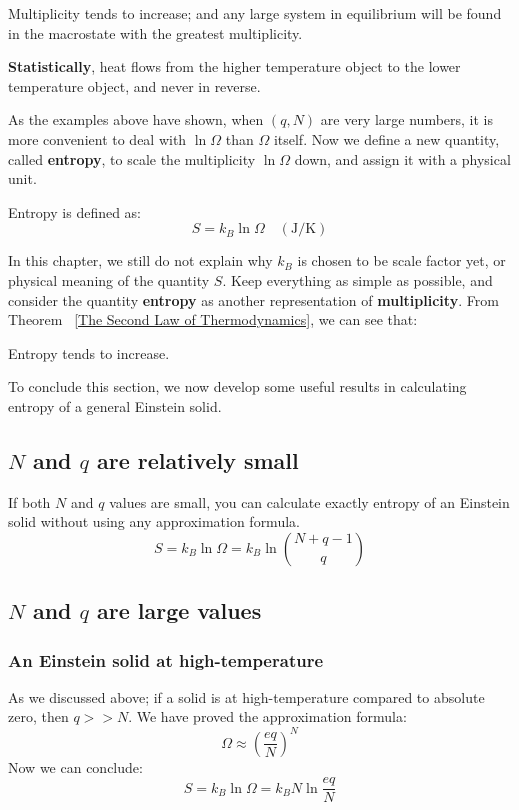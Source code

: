 \documentclass[~/PhyAI/phyai.tex]{subfiles}
\begin{document}
\begin{theorem}
	\label{The Second Law of Thermodynamics}
	Multiplicity tends to increase; and any large system in equilibrium will be found in the macrostate with the greatest multiplicity.
\end{theorem}
\begin{corollary}
	\textbf{Statistically}, heat flows from the higher temperature object to the lower temperature object, and never in reverse.
	\label{Heat flowing direction}
\end{corollary}
As the examples above have shown, when $(q, N)$ are very large numbers, it is more convenient to deal with $\ln\Omega$ than $\Omega$ itself. Now we define a new quantity, called \textbf{entropy}, to scale the multiplicity $\ln\Omega$ down, and assign it with a physical unit.
\begin{definition}
	Entropy is defined as: $$ S=k_{B}\ln\Omega \quad(\text{J/K})$$
\end{definition}
In this chapter, we still do not explain why $k_{B}$ is chosen to be scale factor yet, or physical meaning of the quantity $S$. Keep everything as simple as possible, and consider the quantity \textbf{entropy} as another representation of \textbf{multiplicity}. From Theorem ~\ref{The Second Law of Thermodynamics}, we can see that:
\begin{corollary}
	Entropy tends to increase.
\end{corollary}
To conclude this section, we now develop some useful results in calculating entropy of a general Einstein solid.
\subsection{$N$ and $q$ are relatively small}\label{sub: n and q are relatively small}
If both $N$ and $q$ values are small, you can calculate exactly entropy of an Einstein solid without using any approximation formula.
\begin{equation*}
	S=k_{B}\ln{\Omega}=k_{B}\ln \binom{N+q-1}{q}
\end{equation*}
\subsection{$N$ and $q$ are large values}\label{sub:_n_and_q_are_large_values} %
\subsubsection{An Einstein solid at high-temperature}
As we discussed above; if a solid is at high-temperature compared to absolute zero, then $q>>N$. We have proved the approximation formula:
$$ \Omega\approx \left(\frac{eq}{N}\right)^{N} $$
Now we can conclude: $$ S=k_{B}\ln{\Omega}=k_{B}N\ln{\frac{eq }{N}} $$
\end{document}
